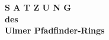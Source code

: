 \begin{titlepage}
    \vspace*{\fill}
    \begin{center}
        \begin{Huge}
            \textbf{
                S A T Z U N G\\
                \vspace{20pt}
                des\\ 
                \vspace{20pt}
                Ulmer Pfadfinder-Rings\\
            }
        \end{Huge}
    \end{center}
    \vspace{150pt}
    \vspace*{\fill}
\end{titlepage}
